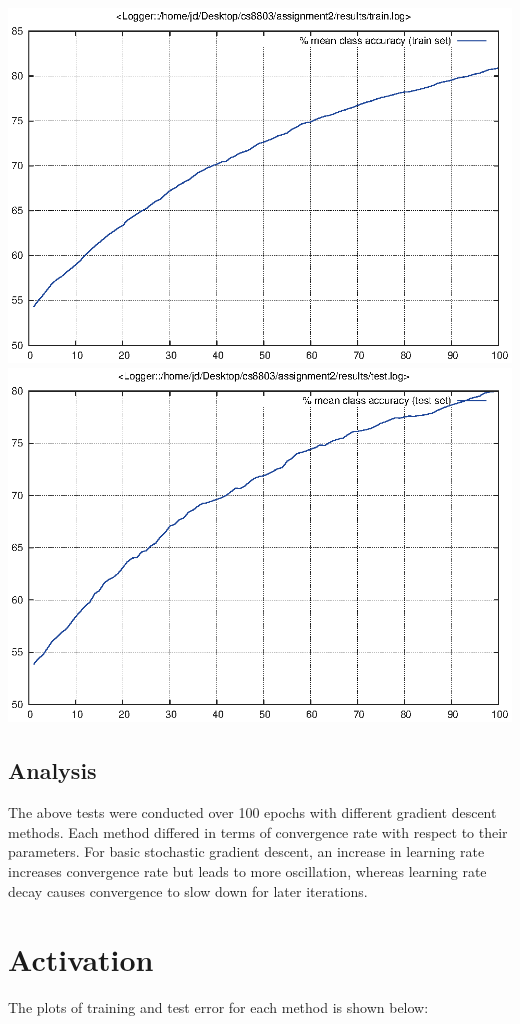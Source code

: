 \documentclass[twoside,12pt]{article}
\newcommand{\imsize}{0.5\linewidth}
\begin{document}
\includegraphics[width=\imsize]{assignment2/results/cd_lr5_train}
\includegraphics[width=\imsize]{assignment2/results/cd_lr5_test}

\subsection{Analysis}

The above tests were conducted over 100 epochs with different gradient descent methods.
Each method differed in terms of convergence rate with respect to their parameters.
For basic stochastic gradient descent, an increase in learning rate increases convergence rate
but leads to more oscillation, whereas learning rate decay causes convergence to slow down
for later iterations. 

\section{Activation}
The plots of training and test error for each method is shown below:
\end{document}
